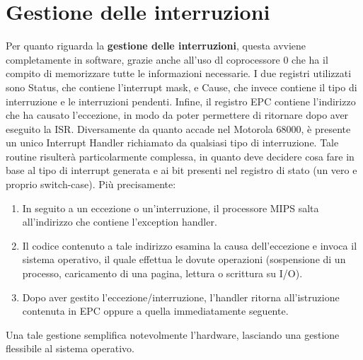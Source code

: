 \section{Gestione delle interruzioni}
Per quanto riguarda la \textbf{gestione delle interruzioni}, questa avviene completamente in software, grazie anche all'uso dl coprocessore 0 che ha il compito di memorizzare tutte le informazioni necessarie. I due registri utilizzati sono Status, che contiene l'interrupt mask, e Cause, che invece contiene il tipo di interruzione e le interruzioni pendenti. Infine, il registro EPC contiene l'indirizzo che ha causato l'eccezione, in modo da poter permettere di ritornare dopo aver eseguito la ISR. Diversamente da quanto accade nel Motorola 68000, è presente un unico Interrupt Handler richiamato da qualsiasi tipo di interruzione. Tale routine risulterà particolarmente complessa, in quanto deve decidere cosa fare in base al tipo di interrupt generata e ai bit presenti nel registro di stato (un vero e proprio switch-case). Più precisamente:
\begin{enumerate}
	\item In seguito a un eccezione o un'interruzione, il processore MIPS salta all'indirizzo che contiene l'exception handler.
	\item Il codice contenuto a tale indirizzo esamina la causa dell'eccezione e invoca il sistema operativo, il quale effettua le dovute operazioni (sospensione di un processo, caricamento di una pagina, lettura o scrittura su I/O).
	\item Dopo aver gestito l'eccezione/interruzione, l'handler ritorna all'istruzione contenuta in EPC oppure a quella immediatamente seguente.
\end{enumerate}
Una tale gestione semplifica notevolmente l'hardware, lasciando una gestione flessibile al sistema operativo.

